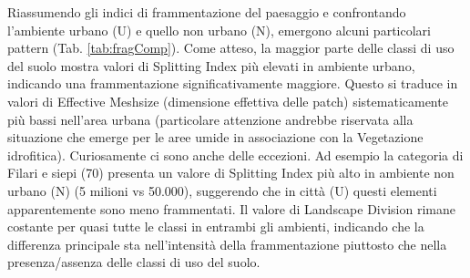 \documentclass[
  a4paper,
]{book}
\begin{document}
Riassumendo gli indici di frammentazione del paesaggio e confrontando l'ambiente urbano (U) e quello non urbano (N), emergono alcuni particolari pattern (Tab. \ref{tab:fragComp}).
Come atteso, la maggior parte delle classi di uso del suolo mostra valori di Splitting Index più elevati in ambiente urbano, indicando una frammentazione significativamente maggiore.
Questo si traduce in valori di Effective Meshsize (dimensione effettiva delle patch) sistematicamente più bassi nell'area urbana (particolare attenzione andrebbe riservata alla situazione che emerge per le aree umide in associazione con la Vegetazione idrofitica).
Curiosamente ci sono anche delle eccezioni.
Ad esempio la categoria di Filari e siepi (70) presenta un valore di Splitting Index più alto in ambiente non urbano (N) (5 milioni vs 50.000), suggerendo che in città (U) questi elementi apparentemente sono meno frammentati.
Il valore di Landscape Division rimane costante per quasi tutte le classi in entrambi gli ambienti, indicando che la differenza principale sta nell'intensità della frammentazione piuttosto che nella presenza/assenza delle classi di uso del suolo.
\end{document}
